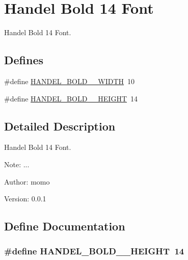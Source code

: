 \hypertarget{group__graphic__device__font__handel14}{
\section{Handel Bold 14 Font}
\label{group__graphic__device__font__handel14}
}
Handel Bold 14 Font.  


\subsection*{Defines}
\begin{CompactItemize}
\item 
\#define \hyperlink{group__graphic__device__font__handel14_g46d2b848919d2bff5c7ea89189328490}{HANDEL\_\-BOLD\_\_\-WIDTH}~10
\item 
\#define \hyperlink{group__graphic__device__font__handel14_g2ff4d08a2a86ff88b59f050e0a41d31c}{HANDEL\_\-BOLD\_\_\-HEIGHT}~14
\end{CompactItemize}


\subsection{Detailed Description}
Handel Bold 14 Font. 

\begin{Desc}
\item[Note:]... \end{Desc}
\begin{Desc}
\item[Author:]momo \end{Desc}
\begin{Desc}
\item[Version:]0.0.1 \end{Desc}


\subsection{Define Documentation}
\hypertarget{group__graphic__device__font__handel14_g2ff4d08a2a86ff88b59f050e0a41d31c}{
\subsubsection[{HANDEL\_\-BOLD\_\-14\_\-HEIGHT}]{\setlength{\rightskip}{0pt plus 5cm}\#define HANDEL\_\-BOLD\_\_\-HEIGHT~14}}
\label{group__graphic__device__font__handel14_g2ff4d08a2a86ff88b59f050e0a41d31c}


